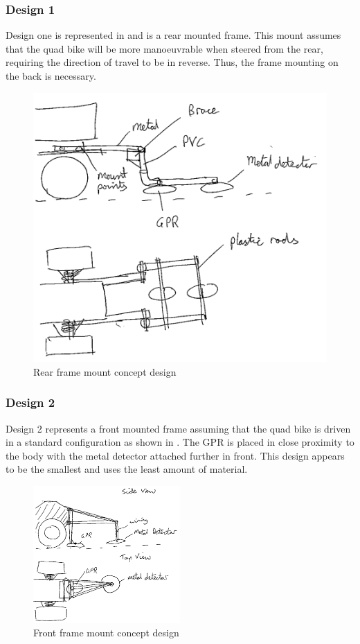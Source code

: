 \documentclass[main.tex]{subfiles}
\begin{document}
\subsubsection{Design 1}
Design one is represented in  and is a rear mounted frame. This mount assumes that the quad bike will be more manoeuvrable when steered from the rear, requiring the direction of travel to be in reverse. Thus, the frame mounting on the back is necessary. 
 \begin{figure}[ht]
 \includegraphics[width=.5\textwidth]{3-ConceptDesign/Rear_Mount.png}
 \centering
 \caption{Rear frame mount concept design}
 \end{figure}

\subsubsection{Design 2}
Design 2 represents a front mounted frame assuming that the quad bike is driven in a standard configuration as shown in . The GPR is placed in close proximity to the body with the metal detector attached further in front. This design appears to be the smallest and uses the least amount of material.
\begin{figure}[ht]
\includegraphics[width=0.5\textwidth]{3-ConceptDesign/front_frame_design_triangle.png}
\centering
\caption{Front frame mount concept design}
\end{figure}
\end{document}

